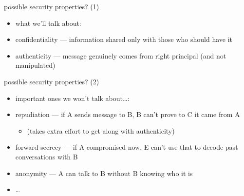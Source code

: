
\begin{frame}{possible security properties? (1)}
    \begin{itemize}
    \item what we'll talk about: 
    \item confidentiality --- information shared only with those who should have it
    \item authenticity --- message genuinely comes from right principal (and not manipulated)
    \end{itemize}
\end{frame}

\begin{frame}{possible security properties? (2)}
    \begin{itemize}
    \item important ones we won't talk about\ldots:
    \item repudiation --- if A sends message to B, B can't prove to C it came from A
        \begin{itemize}
        \item (takes extra effort to get along with authenticity)
        \end{itemize}
    \item forward-secrecy --- if A compromised now, E can't use that to decode past conversations with B
    \item anonymity --- A can talk to B without B knowing who it is
    \item \ldots
    \end{itemize}
\end{frame}


